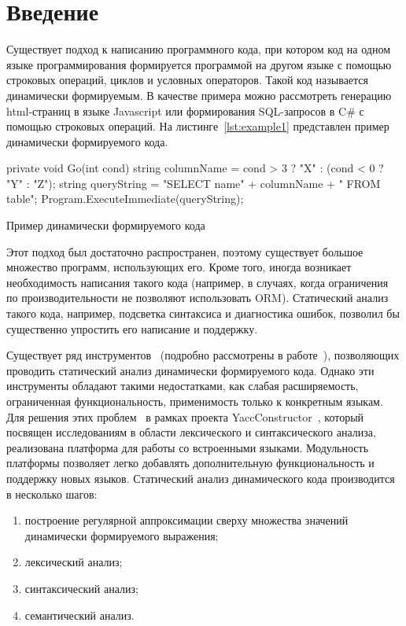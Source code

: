 \section*{Введение}
Существует подход к написанию программного кода, при котором код на одном языке программирования формируется программой на другом языке с помощью строковых операций, циклов и условных операторов. Такой код называется динамически формируемым. В качестве примера можно рассмотреть генерацию html-страниц в языке Javascript или формирования SQL-запросов в C\# с помощью строковых операций. На листинге~\ref{lst:example1} представлен пример динамически формируемого кода.

\begin{listing}[H]
    \begin{pyglist}[language=csharp,numbers=left,numbersep=5pt]
 private void Go(int cond){
   string columnName = cond > 3 ? "X" : (cond < 0 ? "Y" : "Z");
   string queryString = 
       "SELECT name" + columnName + " FROM table";
   Program.ExecuteImmediate(queryString);}
    \end{pyglist}
\caption{Пример динамически формируемого кода}
\label{lst:example1}
\end{listing}

Этот подход был достаточно распространен, поэтому существует большое множество программ, использующих его. Кроме того, иногда возникает необходимость написания такого кода (например, в случаях, когда ограничения по производительности не позволяют использовать ORM). Статический анализ такого кода, например, подсветка синтаксиса и диагностика ошибок, позволил бы существенно упростить его написание и поддержку.

Существует ряд инструментов~\cite{Alvor, JSA, PHPSA} (подробно рассмотрены в работе~\cite{polubelova}), позволяющих проводить статический анализ динамически формируемого кода. Однако эти инструменты обладают такими недостатками, как слабая расширяемость, ограниченная функциональность, применимость только к конкретным языкам. Для решения этих проблем~\cite{GrigorievPhd} в рамках проекта YaccConstructor~\cite{YCUrl, articleYC}, который посвящен исследованиям в области лексического и синтаксического анализа, реализована платформа для работы со встроенными языками. Модульность платформы позволяет легко добавлять дополнительную функциональность и поддержку новых языков. Статический анализ динамического кода производится в несколько шагов: 
\begin{enumerate}
\item построение регулярной аппроксимации сверху множества значений динамически формируемого выражения;
\item лексический анализ;
\item синтаксический анализ;
\item семантический анализ.
\end{enumerate}

